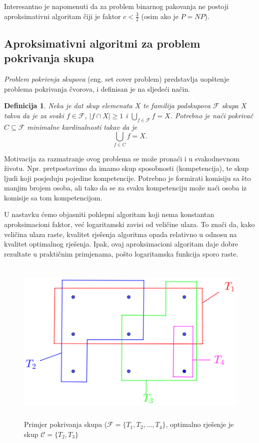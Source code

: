 \documentclass[b5paper, utf8, 11pt, colorlinks]{book}
\newtheorem{definition}{Definicija}[chapter]
\theoremstyle{definition}
\begin{document}
Interesantno je napomenuti da za problem binarnog pakovanja ne postoji aproksimativni algoritam čiji je faktor $c <\frac{3}{2}$ (osim ako je $P=NP$). 

 \subsection{Aproksimativni algoritmi za problem pokrivanja skupa}
\textit{Problem pokrivnja skupova} (eng. set cover problem) predstavlja uopštenje problema pokrivanja čvorova, i definisan je na sljedeći način.
\begin{definition}
    Neka je dat skup elemenata $X$ te familija podskupova $\mathcal{F}$ skupa $X$ takva da je za svaki $f\in \mathcal{F}$, $|f \cap X| \geq 1$ i $\bigcup_{f \in \mathcal{F}} f = X$. 
	    Potrebno je naći pokrivač $C \subseteq \mathcal{F}$ minimalne kardinalnosti takav da je 
	    $$ \bigcup_{f \in C} f = X.$$
\end{definition}


Motivacija za razmatranje ovog problema se može pronaći i u svakodnevnom životu. Npr. pretpostavimo da imamo skup sposobnosti (kompetencija), te skup ljudi koji posjeduju pojedine kompetencije. Potrebno je formirati komisiju sa što manjim brojem osoba, ali tako da se za svaku kompetenciju može naći osoba iz komisije sa tom kompetencijom.
 

 U nastavku ćemo objasniti pohlepni algoritam koji nema konstantan aproksimacioni faktor, već logaritamski zavisi od veličine ulaza. To znači da, kako veličina ulaza raste, kvalitet rješenja algoritma opada relativno u odnosu na kvalitet optimalnog rješenja. Ipak,  ovaj aproksimacioni algoritam  daje dobre rezultate u praktičnim primjenama, pošto logaritamska funkcija sporo raste.

\begin{figure}
	\centering
	\includegraphics[width=120mm, height=80mm]{set-cover-1.eps}
	\caption{Primjer pokrivanja skupa ($\mathcal{F}=\{T_1,T_2,...,T_4\}$, optimalno rješenje je skup $\mathcal{C}=\{T_2, T_3\}$}
	 \label{fig:set-cover-1}
\end{figure}
 
\end{document}
